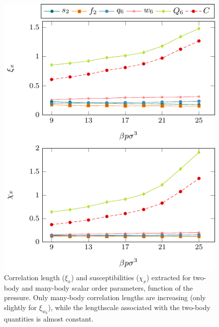 \documentclass[twocolumn,superscriptaddress]{revtex4}
\begin{document}
\begin{figure}
	\centering
	\includegraphics{fig_lengths}
	\caption{Correlation length ($\xi_x$) and susceptibilities ($\chi_x$) extracted for two-body and many-body scalar order parameters, function of the pressure. Only many-body correlation lengths are increasing (only slightly for $\xi_{w_6}$), while the lengthscale associated with the two-body quantities is almost constant.}
	\label{fig:Fourierlengths}
\end{figure}
\end{document}
